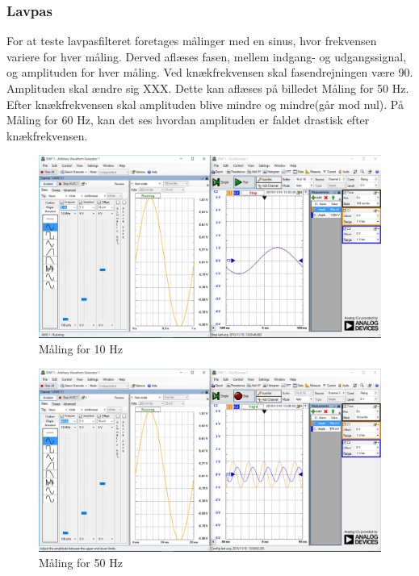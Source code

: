 \subsubsection{Lavpas}
For at teste lavpasfilteret foretages målinger med en sinus, hvor frekvensen variere for hver måling. Derved aflæses fasen, mellem indgang- og udgangssignal, og amplituden for hver måling. 
Ved knækfrekvensen skal fasendrejningen være 90\textdegree. Amplituden skal ændre sig XXX. Dette kan aflæses på billedet Måling for 50 Hz.
Efter knækfrekvensen skal amplituden blive mindre og mindre(går mod nul). På Måling for 60 Hz, kan det ses hvordan amplituden er faldet drastisk efter knækfrekvensen.  \\
\begin{figure}[htb]
	\centering
	\includegraphics[width=1.0\textwidth]{Figurer/10Hz}
	\caption{Måling for 10 Hz}
	\label{fig:maeling10Hz}
\end{figure}

\begin{figure}[htb]
	\centering
	\includegraphics[width=1.0\textwidth]{Figurer/50Hz}
	\caption{Måling for 50 Hz}
	\label{fig:maeling50Hz}
\end{figure}

